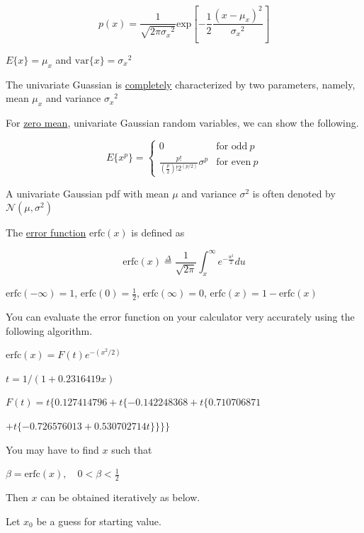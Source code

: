 \documentclass[fleqn]{article}
\begin{document}
\begin{enumerate}
		\begin{equation*}
			p(x) = \frac{1}{\sqrt{2\pi{\sigma_x}^2}}\text{exp}\left[-\frac{1}{2}\frac{(x-\mu_x)^2}{{\sigma_x}^2}\right]
		\end{equation*}
		
		$E\{x\} = \mu_x$ and $\text{var}\{x\} = {\sigma_x}^2$
		
		The univariate Guassian is \underline{completely} characterized by two parameters, namely, mean $\mu_x$ and variance ${\sigma_x}^2$
		
		For \underline{zero mean}, univariate Gaussian random variables, we can show the following.
		
		\begin{equation*}
			E\{x^p\} = \begin{cases}
				0 & \text{for odd}\ p\\
				\frac{p!}{\left(\frac{p}{2}\right)!2^{(p/2)}}\sigma^p & \text{for even}\ p
			\end{cases}
		\end{equation*}
			
		A univariate Gaussian pdf with mean $\mu$ and variance $\sigma^2$ is often denoted by $\mathcal{N}(\mu,\sigma^2)$
		
		The \underline{error function} $\text{erfc}(x)$ is defined as
		
		\begin{equation*}
			\text{erfc}(x) \overset{\Delta}{=} \frac{1}{\sqrt{2\pi}}\int_x^{\infty}{e^{-\frac{u^2}{2}}du}
		\end{equation*}
		
		$\text{erfc}(-\infty) = 1$, $\text{erfc}(0) = \frac{1}{2}$, $\text{erfc}(\infty) = 0$, $\text{erfc}(x) = 1 - \text{erfc}(x)$
		
		You can evaluate the error function on your calculator very accurately using the following algorithm.
		
		$\text{erfc}(x) = F(t)e^{-(x^2/2)}$
		
		$t = 1/(1 + 0.2316419x)$
		
		$F(t) = t\{0.127414796 + t\{-0.142248368 + t\{0.710706871$
		
		$+ t\{-0.726576013 + 0.530702714t\}\}\}\}$
		
		You may have to find $x$ such that
		
		$\beta = \text{erfc}(x),\quad 0 < \beta < \frac{1}{2}$
		
		Then $x$ can be obtained iteratively as below.
		
		Let $x_0$ be a guess for starting value.
		

\end{enumerate}
\end{document}
